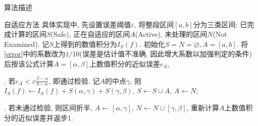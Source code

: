 \documentclass{article}
\begin{document}
\begin{section}{算法描述}
\begin{subsection}{自适应方法}
    具体实现中, 先设置误差阈值$\varepsilon$, 将整段区间$[a,b]$分为三类区间: 已完成计算的区间$S$(Safe), 
    正在自适应的区间$A$(Active), 未处理的区间$N$(Not Examined). 记$S$上得到的数值积分为$I_S(f)$.
    初始化$S=N=\varnothing, A=[a,b] $. 将\eqref{error}中的系数改为$1/10$(误差是估计值不准确, 因此增大系数以加强判定的条件)后按该公式计算$A=[\alpha,\beta]$上数值积分的近似误差$e_A$, 

    . 若$e_A<\varepsilon \frac{\beta-\alpha}{b-a}$, 即通过检验. 记$A$的中点$\gamma$, 则$I_S(f)\leftarrow I_S(f)+S(\alpha,\gamma)+S(\gamma,\beta)$, $S\leftarrow S\cup A$, $A\leftarrow N$;

    . 若未通过检验, 则区间折半, $A\leftarrow [\alpha,\gamma]$, $N\leftarrow N\cup [\gamma,\beta]$, 重新计算$A$上数值积分的近似误差并返步1.
\end{subsection}
\end{section}
\end{document}
